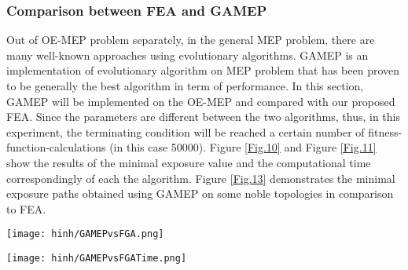 \documentclass[final]{elsarticle}
\begin{document}
\subsubsection{Comparison between FEA and GAMEP}
Out of OE-MEP problem separately, in the general MEP problem, there are many well-known approaches using evolutionary algorithms. GAMEP \cite{binh2019efficient} is an implementation of evolutionary algorithm on MEP problem that has been proven to be generally the best algorithm in term of performance. In this section, GAMEP will be implemented on the OE-MEP and compared with our proposed FEA. Since the parameters are different between the two algorithms, thus, in this experiment, the terminating condition will be reached a certain number of fitness-function-calculations (in this case 50000). Figure \ref{Fig.10} and Figure \ref{Fig.11} show the results of the minimal exposure value and the computational time correspondingly of each the algorithm. Figure \ref{Fig.13} demonstrates the minimal exposure paths obtained using GAMEP on some noble topologies in comparison to FEA.
\begin{figure*}[h]
	\texttt{[image: hinh/GAMEPvsFGA.png]}
	\centering
	\caption{The minimal exposure value comparison between FEA and GAMEP on some noble topologies
	}
	\label{Fig.10}       %
\end{figure*}
\begin{figure*}[h]
	\texttt{[image: hinh/GAMEPvsFGATime.png]}
	\centering
	\caption{The computational time (sec) comparison between FEA and GAMEP on some noble topologies
	}
	\label{Fig.11}       %
\end{figure*}
\end{document}
